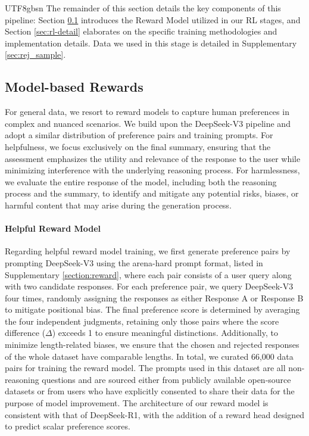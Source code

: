 \documentclass[11pt, a4paper, logo, copyright, nonumbering]{deepseek}
\begin{document}
\begin{CJK*}{UTF8}{gbsn}
The remainder of this section details the key components of this pipeline: Section \ref{sec: model_reward} introduces the Reward Model utilized in our RL stages, and Section \ref{sec:rl-detail} elaborates on the specific training methodologies and implementation details. Data we used in this stage is detailed in Supplementary \ref{sec:rej_sample}.

\subsection{Model-based Rewards}\label{sec: model_reward}

For general data, we resort to reward models to capture human preferences in complex and nuanced scenarios. We build
upon the DeepSeek-V3 pipeline and adopt a similar distribution of preference pairs and training prompts. For helpfulness, we focus exclusively on the final summary, ensuring that the
assessment emphasizes the utility and relevance of the response to the user while minimizing
interference with the underlying reasoning process. For harmlessness, we evaluate the entire
response of the model, including both the reasoning process and the summary, to identify and
mitigate any potential risks, biases, or harmful content that may arise during the generation
process.

\paragraph{Helpful Reward Model}

Regarding helpful reward model training, we first generate preference pairs by prompting DeepSeek-V3 using the arena-hard prompt format, listed in Supplementary \ref{section:reward}, where each pair consists of a user query along with two candidate responses. For each preference pair, we query DeepSeek-V3 four times, randomly assigning the responses as either Response A or Response B to mitigate positional bias. The final preference score is determined by averaging the four independent judgments, retaining only those pairs where the score difference ($\Delta$) exceeds 1 to ensure meaningful distinctions. Additionally, to minimize length-related biases, we ensure that the chosen and rejected responses of the whole dataset have comparable lengths. In total, we curated 66,000 data pairs for training the reward model. The prompts used in this dataset are all non-reasoning questions and are sourced either from publicly available open-source datasets or from users who have explicitly consented to share their data for the purpose of model improvement. The architecture of our reward model is consistent with that of DeepSeek-R1, with the addition of a reward head designed to predict scalar preference scores. 


\end{CJK*}
\end{document}
